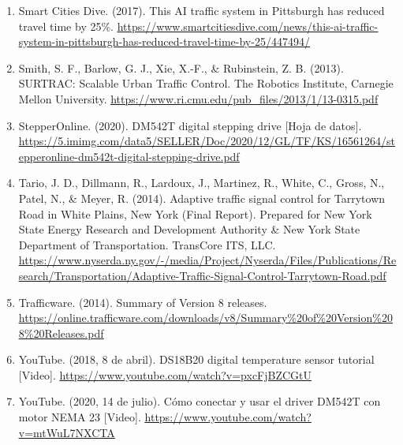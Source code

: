\documentclass[12pt,a4paper,oneside]{report}
\providecommand{\ul}[1]{\underline{#1}}
\begin{document}
\begin{enumerate}
\item
  Smart Cities Dive. (2017). This AI traffic system in Pittsburgh has reduced travel time by 25\%. \href{https://www.smartcitiesdive.com/news/this-ai-traffic-system-in-pittsburgh-has-reduced-travel-time-by-25/447494/}{\ul{https://www.smartcitiesdive.com/news/this-ai-traffic-system-in-pittsburgh-has-reduced-travel-time-by-25/447494/}}
\item
  Smith, S. F., Barlow, G. J., Xie, X.-F., \& Rubinstein, Z. B. (2013). SURTRAC: Scalable Urban Traffic Control. The Robotics Institute, Carnegie Mellon University. \href{https://www.ri.cmu.edu/pub_files/2013/1/13-0315.pdf}{\ul{https://www.ri.cmu.edu/pub\_files/2013/1/13-0315.pdf}}
\item
  StepperOnline. (2020). DM542T digital stepping drive {[}Hoja de datos{]}. \href{https://5.imimg.com/data5/SELLER/Doc/2020/12/GL/TF/KS/16561264/stepperonline-dm542t-digital-stepping-drive.pdf}{\ul{https://5.imimg.com/data5/SELLER/Doc/2020/12/GL/TF/KS/16561264/stepperonline-dm542t-digital-stepping-drive.pdf}}
\item
  Tario, J. D., Dillmann, R., Lardoux, J., Martinez, R., White, C., Gross, N., Patel, N., \& Meyer, R. (2014). Adaptive traffic signal control for Tarrytown Road in White Plains, New York (Final Report). Prepared for New York State Energy Research and Development Authority \& New York State Department of Transportation. TransCore ITS, LLC. \href{https://www.nyserda.ny.gov/-/media/Project/Nyserda/Files/Publications/Research/Transportation/Adaptive-Traffic-Signal-Control-Tarrytown-Road.pdf}{\ul{https://www.nyserda.ny.gov/-/media/Project/Nyserda/Files/Publications/Research/Transportation/Adaptive-Traffic-Signal-Control-Tarrytown-Road.pdf}}
\item
  Trafficware. (2014). Summary of Version 8 releases. \href{https://online.trafficware.com/downloads/v8/Summary\%20of\%20Version\%208\%20Releases.pdf}{\ul{https://online.trafficware.com/downloads/v8/Summary\%20of\%20Version\%208\%20Releases.pdf}}
\item
  YouTube. (2018, 8 de abril). DS18B20 digital temperature sensor tutorial {[}Video{]}. \href{https://www.youtube.com/watch?v=pxcFjBZCGtU}{\ul{https://www.youtube.com/watch?v=pxcFjBZCGtU}}
\item
  YouTube. (2020, 14 de julio). Cómo conectar y usar el driver DM542T con motor NEMA 23 {[}Video{]}. \href{https://www.youtube.com/watch?v=mtWuL7NXCTA}{\ul{https://www.youtube.com/watch?v=mtWuL7NXCTA}}
\end{enumerate}
\end{document}
